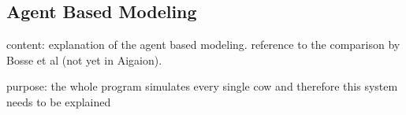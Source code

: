 \subsection{Agent Based Modeling}
content: explanation of the agent based modeling. reference to the comparison by Bosse et al (not yet in Aigaion).

purpose: the whole program simulates every single cow and therefore this system needs to be explained 